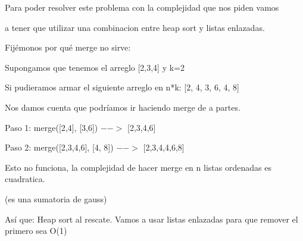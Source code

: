\documentclass[10pt,a4paper]{article}
\begin{document}
\newpage


\par Para poder resolver este problema con la complejidad que nos piden vamos
\par a tener que utilizar una combinacion entre heap sort y listas enlazadas.
\par Fijémonos por qué merge no sirve:
\par Supongamos que tenemos el arreglo [2,3,4] y k=2
\par Si pudieramos armar el siguiente arreglo en n*k: [2, 4, 3, 6, 4, 8]
\par Nos damos cuenta que podríamos ir haciendo merge de a partes.
\par Paso 1: merge([2,4], [3,6]) \ensuremath{-->} [2,3,4,6]
\par Paso 2: merge([2,3,4,6], [4, 8]) \ensuremath{-->} [2,3,4,4,6,8]
\par Esto no funciona, la complejidad de hacer merge en n listas ordenadas es cuadratica.
\par (es una sumatoria de gauss)
\par Así que: Heap sort al rescate. Vamos a usar listas enlazadas para que remover el primero sea O(1)
\end{document}
